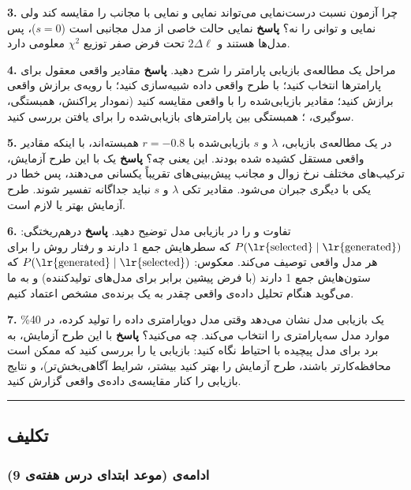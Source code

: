 \textbf{3.} چرا آزمون نسبت درست‌نمایی می‌تواند نمایی و نمایی با مجانب را
مقایسه کند ولی نمایی و توانی را نه؟ \textbf{پاسخ} نمایی حالت خاصی از مدل
مجانبی است (\(s = 0\))، پس مدل‌ها  هستند و \(2\Delta\ell\) تحت
فرض صفر توزیع \(\chi^2\) معلومی دارد.

\textbf{4.} مراحل یک مطالعه‌ی بازیابی پارامتر را شرح دهید. \textbf{پاسخ}
مقادیر واقعی معقول برای پارامترها انتخاب کنید؛ با طرح واقعی داده
شبیه‌سازی کنید؛ با رویه‌ی برازش واقعی برازش کنید؛ مقادیر بازیابی‌شده را با
واقعی مقایسه کنید (نمودار پراکنش، همبستگی، سوگیری، ؛ همبستگی
بین پارامترهای بازیابی‌شده را برای یافتن  بررسی کنید.

\textbf{5.} در یک مطالعه‌ی بازیابی، \(\lambda\) و \(s\) بازیابی‌شده با
\(r = -0.8\) همبسته‌اند، با اینکه مقادیر واقعی مستقل کشیده شده بودند. این
یعنی چه؟ \textbf{پاسخ} یک  با این طرح آزمایش، ترکیب‌های
مختلف نرخ زوال و مجانب پیش‌بینی‌های تقریباً یکسانی می‌دهند، پس خطا در یکی با
دیگری جبران می‌شود. مقادیر تکی \(\lambda\) و \(s\) نباید جداگانه تفسیر
شوند. طرح آزمایش بهتر یا  لازم است.

\textbf{6.} تفاوت  و  را در
بازیابی مدل توضیح دهید. \textbf{پاسخ} درهم‌ریختگی:
\(P(\text{\lr{selected}} \mid \text{\lr{generated}})\) که سطرهایش جمع 1 دارند و
رفتار روش را برای هر مدل واقعی توصیف می‌کند. معکوس:
\(P(\text{\lr{generated}} \mid \text{\lr{selected}})\) که ستون‌هایش جمع 1 دارند (با
فرض پیشین برابر برای مدل‌های تولیدکننده) و به ما می‌گوید هنگام تحلیل داده‌ی
واقعی چقدر به یک برنده‌ی مشخص اعتماد کنیم.

\textbf{7.} یک بازیابی مدل نشان می‌دهد وقتی مدل دوپارامتری داده را تولید
کرده،  در 40\% موارد مدل سه‌پارامتری را انتخاب می‌کند. چه می‌کنید؟
\textbf{پاسخ} با این طرح آزمایش، به برد  برای مدل پیچیده با
احتیاط نگاه کنید: بازیابی  یا  را بررسی کنید که ممکن است
محافظه‌کارتر باشند، طرح آزمایش را بهتر کنید  بیشتر، شرایط
آگاهی‌بخش‌تر)، و نتایج بازیابی را کنار مقایسه‌ی داده‌ی واقعی گزارش کنید.

\begin{center}\rule{0.5\linewidth}{0.5pt}\end{center}


\subsection{تکلیف}

\subsubsection{\texorpdfstring{ادامه‌ی  (موعد ابتدای درس هفته‌ی
9)}{ادامه‌ی A3 (موعد ابتدای درس هفته‌ی 9)}}

